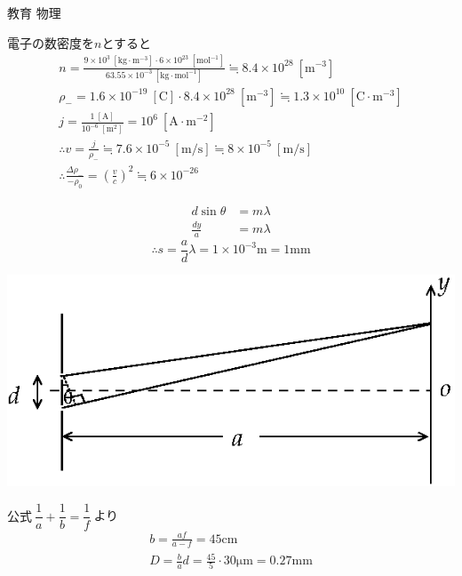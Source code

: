 \documentclass[fleqn]{jbook}
\begin{document}
\begin{answer}{教育 物理}{}
\begin{subanswers}
\begin{subsubanswers}
\SubSubAnswer
電子の数密度を$n$とすると
\begin{gather*}
n=\frac{9\times10^3~\mathrm{[kg\cdot m^{-3}]}\cdot6\times10^{23}~\mathrm{[mol^{-1}]}}{63.55\times10^{-3}~\mathrm{[kg\cdot mol^{-1}]}}\fallingdotseq 8.4\times10^{28}~\mathrm{[m^{-3}]} \\
\rho_-=1.6\times10^{-19}~\mathrm{[C]}\cdot8.4\times10^{28}~\mathrm{[m^{-3}]}\fallingdotseq 1.3\times10^{10}~\mathrm{[C\cdot m^{-3}]} \\
j=\frac{1~\mathrm{[A]}}{10^{-6}~\mathrm{[m^2]}}=10^6~\mathrm{[A\cdot m^{-2}]} \\
\therefore v=\frac{j}{\rho_-}\fallingdotseq 7.6\times10^{-5}~\mathrm{[m/s]}\fallingdotseq 8\times10^{-5}~\mathrm{[m/s]}\\
\therefore \frac{\Delta \rho_-}{-\rho_0}=\left(\frac{v}{c}\right)^2\fallingdotseq 6\times10^{-26}
\end{gather*}

\end{subsubanswers}

\SubAnswer
\begin{subsubanswers}
\SubSubAnswer
\parbox[t]{.5\linewidth}{
\begin{align*}
d\sin\theta&=m\lambda\\
\frac{dy}{a}&=m\lambda
\end{align*}
\[ \therefore s=\frac{a}{d}\lambda=1\times10^{-3}\mathrm{m} =1\mathrm{mm}\]
}
\parbox[t]{.5\linewidth}{
\begin{center}
\includegraphics[clip]{1999phys3-3.eps}
\end{center}
}

\SubSubAnswer
$ 公式 \: \dfrac{1}{a}+\dfrac{1}{b}=\dfrac{1}{f} \:$より
\begin{gather*}
b=\frac{af}{a-f}=45\mathrm{cm} \\
D=\frac{b}{a}d=\frac{45}{5}\cdot 30\mathrm{\mu m}=0.27\mathrm{mm} \\
\end{gather*}


\end{subsubanswers}
\end{subanswers}
\end{answer}
\end{document}

